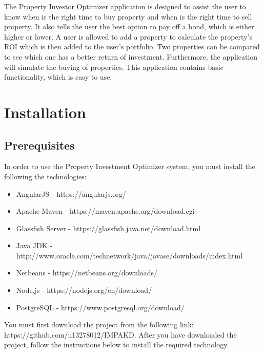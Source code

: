 \documentclass[a4paper,12pt]{article}
\begin{document}
The Property Investor Optimizer application is designed to assist the user to know when is the right time to buy property and when is the right time to sell property. It also tells the user the best option to pay off a bond, which is either higher or lower. A user is allowed to add a property to calculate the property's ROI which is then added to the user's portfolio. Two properties can be compared to see which one has a better return of investment. Furthermore, the application will simulate the buying of properties. This application contains basic functionality, which is easy to use.
\section{Installation}

\subsection{Prerequisites}
In order to use the Property Investment Optimizer system, you must install the following the technologies:
\begin{itemize}
\item{AngularJS - https://angularjs.org/}
\item{Apache Maven - https://maven.apache.org/download.cgi}
\item{Glassfish Server - https://glassfish.java.net/download.html}
\item{Java JDK - http://www.oracle.com/technetwork/java/javase/downloads/index.html}
\item{Netbeans - https://netbeans.org/downloads/}
\item{Node.js - https://nodejs.org/en/download/}
\item{PostgreSQL - https://www.postgresql.org/download/}
\end{itemize}
You must first download the project from the following link: https://github.com/u13278012/IMPAKD. After you have downloaded the project, follow the instructions below to install the required technology.


\newpage
\end{document}
